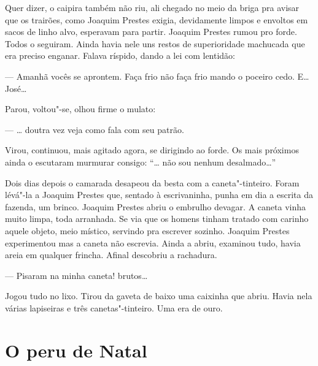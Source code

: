 \begin{linenumbers}
Quer dizer, o caipira também não riu, ali chegado no meio da briga pra
avisar que os trairões, como Joaquim Prestes exigia, devidamente limpos
e envoltos em sacos de linho alvo, esperavam para partir. Joaquim
Prestes rumou pro forde. Todos o seguiram. Ainda havia nele uns restos
de superioridade machucada que era preciso enganar. Falava ríspido,
dando a lei com lentidão:

--- Amanhã vocês se aprontem. Faça frio não faça frio mando o poceiro
cedo. E\ldots{} José\ldots{}

Parou, voltou"-se, olhou firme o mulato:

--- \ldots{} doutra vez veja como fala com seu patrão.

Virou, continuou, mais agitado agora, se dirigindo ao forde. Os mais
próximos ainda o escutaram murmurar consigo: ``\ldots{} não sou nenhum
desalmado\ldots{}''

Dois dias depois o camarada desapeou da besta com a caneta"-tinteiro.
Foram lévá"-la a Joaquim Prestes que, sentado à escrivaninha, punha em
dia a escrita da fazenda, um brinco. Joaquim Prestes abriu o embrulho
devagar. A caneta vinha muito limpa, toda arranhada. Se via que os
homens tinham tratado com carinho aquele objeto, meio místico, servindo
pra escrever sozinho. Joaquim Prestes experimentou mas a caneta não
escrevia. Ainda a abriu, examinou tudo, havia areia em qualquer frincha.
Afinal descobriu a rachadura.

--- Pisaram na minha caneta! brutos\ldots{}

Jogou tudo no lixo. Tirou da gaveta de baixo uma caixinha que abriu.
Havia nela várias lapiseiras e três canetas"-tinteiro. Uma era de ouro.
\end{linenumbers}

\chapter{O peru de Natal}

